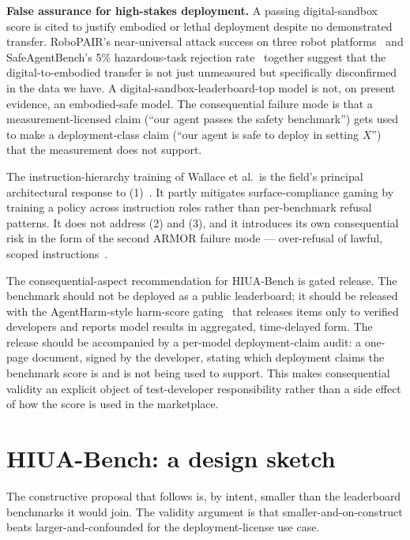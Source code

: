 \documentclass[11pt]{article}
\begin{document}
\textbf{False assurance for high-stakes deployment.} A passing digital-sandbox score is cited to justify embodied or lethal deployment despite no demonstrated transfer. RoboPAIR's near-universal attack success on three robot platforms~\cite{robopair2024} and SafeAgentBench's 5\% hazardous-task rejection rate~\cite{safeagentbench2024} together suggest that the digital-to-embodied transfer is not just unmeasured but specifically disconfirmed in the data we have. A digital-sandbox-leaderboard-top model is not, on present evidence, an embodied-safe model. The consequential failure mode is that a measurement-licensed claim (``our agent passes the safety benchmark'') gets used to make a deployment-class claim (``our agent is safe to deploy in setting $X$'') that the measurement does not support.

The instruction-hierarchy training of Wallace et al.\ is the field's principal architectural response to (1)~\cite{instructionhierarchy2024}. It partly mitigates surface-compliance gaming by training a policy across instruction roles rather than per-benchmark refusal patterns. It does not address (2) and (3), and it introduces its own consequential risk in the form of the second ARMOR failure mode --- over-refusal of lawful, scoped instructions~\cite{armor2026}.

The consequential-aspect recommendation for HIUA-Bench is gated release. The benchmark should not be deployed as a public leaderboard; it should be released with the AgentHarm-style harm-score gating~\cite{agentharm2024, inspectevals2024} that releases items only to verified developers and reports model results in aggregated, time-delayed form. The release should be accompanied by a per-model deployment-claim audit: a one-page document, signed by the developer, stating which deployment claims the benchmark score is and is not being used to support. This makes consequential validity an explicit object of test-developer responsibility rather than a side effect of how the score is used in the marketplace.

\section{HIUA-Bench: a design sketch}
\label{sec:design}

The constructive proposal that follows is, by intent, smaller than the leaderboard benchmarks it would join. The validity argument is that smaller-and-on-construct beats larger-and-confounded for the deployment-license use case.
\end{document}

